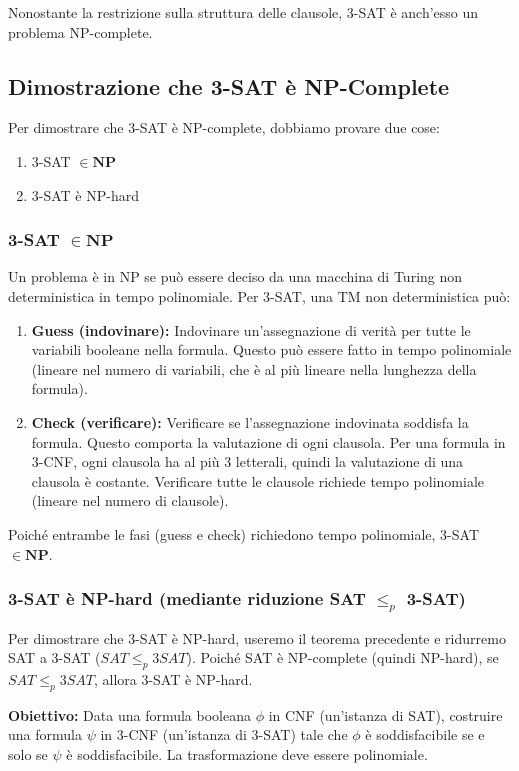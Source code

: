\documentclass[a4paper]{article}
\begin{document}
Nonostante la restrizione sulla struttura delle clausole, 3-SAT è anch'esso un problema NP-complete.

\subsection{Dimostrazione che 3-SAT è NP-Complete}

Per dimostrare che 3-SAT è NP-complete, dobbiamo provare due cose:
\begin{enumerate}
    \item 3-SAT $\in \mathbf{NP}$
    \item 3-SAT è NP-hard
\end{enumerate}

\subsubsection{3-SAT $\in \mathbf{NP}$}
Un problema è in NP se può essere deciso da una macchina di Turing non deterministica in tempo polinomiale.
Per 3-SAT, una TM non deterministica può:
\begin{enumerate}
    \item \textbf{Guess (indovinare):} Indovinare un'assegnazione di verità per tutte le variabili booleane nella formula. Questo può essere fatto in tempo polinomiale (lineare nel numero di variabili, che è al più lineare nella lunghezza della formula).
    \item \textbf{Check (verificare):} Verificare se l'assegnazione indovinata soddisfa la formula. Questo comporta la valutazione di ogni clausola. Per una formula in 3-CNF, ogni clausola ha al più 3 letterali, quindi la valutazione di una clausola è costante. Verificare tutte le clausole richiede tempo polinomiale (lineare nel numero di clausole).
\end{enumerate}
Poiché entrambe le fasi (guess e check) richiedono tempo polinomiale, 3-SAT $\in \mathbf{NP}$.

\subsubsection{3-SAT è NP-hard (mediante riduzione SAT $\le_p$ 3-SAT)}

Per dimostrare che 3-SAT è NP-hard, useremo il teorema precedente e ridurremo SAT a 3-SAT ($SAT \le_p 3SAT$). Poiché SAT è NP-complete (quindi NP-hard), se $SAT \le_p 3SAT$, allora 3-SAT è NP-hard.

\textbf{Obiettivo:} Data una formula booleana $\phi$ in CNF (un'istanza di SAT), costruire una formula $\psi$ in 3-CNF (un'istanza di 3-SAT) tale che $\phi$ è soddisfacibile se e solo se $\psi$ è soddisfacibile. La trasformazione deve essere polinomiale.
\end{document}
